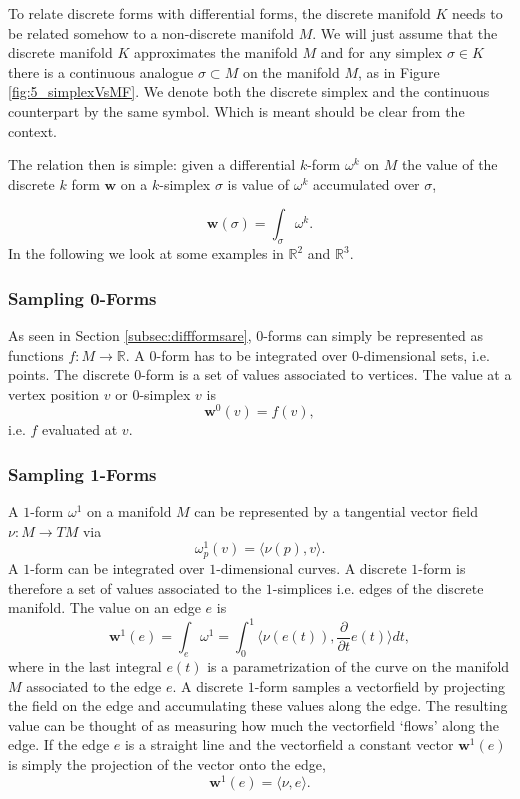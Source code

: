 To relate discrete forms with differential forms, the discrete manifold $K$ needs to be related somehow to a non-discrete manifold $M$. We will just assume that the discrete manifold $K$ approximates the manifold $M$ and for any simplex $\sigma \in K$ there is a continuous analogue $\sigma \subset M$ on the manifold $M$, as in Figure \ref{fig:5_simplexVsMF}. We denote both the discrete simplex and the continuous counterpart by the same symbol. Which is meant should be clear from the context.

The relation then is simple: given a differential $k$-form $\omega^k$ on $M$ the value of the discrete $k$ form $\textbf{w}$ on a $k$-simplex $\sigma$ is value of $\omega^k$ accumulated over $\sigma$,

 \[\textbf{w}(\sigma) = \int_\sigma \omega^k.\]
In the following we look at some examples in $\mathbb R^2$ and $\mathbb R^3$.

\subsubsection{Sampling 0-Forms}
As seen in Section \ref{subsec:diffformsare}, $0$-forms can simply be represented as functions $f: M\to \mathbb R$. A $0$-form has to be integrated over 0-dimensional sets, i.e. points. The discrete 0-form is a set of values associated to vertices. The value at a vertex position $v$ or 0-simplex $v$
 is
\[\textbf{w}^0(v) = f(v),\]
i.e. $f$ evaluated at $v$.

\subsubsection{Sampling 1-Forms}
A $1$-form $\omega^1$ on a manifold $M$ can be represented by a tangential vector field $\nu:M\to TM$ via 
\[\omega^1_p(v) = \langle\nu(p),v\rangle.\] 
A $1$-form can be integrated over $1$-dimensional curves. A discrete $1$-form is therefore a set of values associated to the $1$-simplices i.e. edges of the discrete manifold. The value on an edge $e$ is
\[\textbf{w}^1(e) = \int_{e} \omega^1 = \int_{0}^1 \langle\nu(e(t)),\frac{\partial}{\partial t}e(t)\rangle dt,\]
where in the last integral $e(t)$ is a parametrization of the curve on the manifold $M$ associated to the edge $e$. A discrete $1$-form samples a vectorfield by projecting the field on the edge and accumulating these values along the edge. The resulting value can be thought of as measuring how much the vectorfield `flows' along the edge. If the edge $e$ is a straight line and the vectorfield a constant vector  $\textbf{w}^1(e)$ is simply the projection of the vector onto the edge,
\[\textbf{w}^1(e) = \langle \nu, e \rangle.\]


